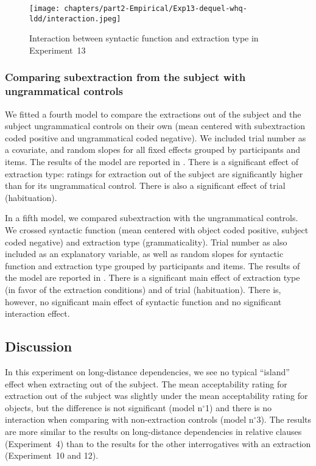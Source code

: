 

\begin{figure}
    \centering
    \texttt{[image: chapters/part2-Empirical/Exp13-dequel-whq-ldd/interaction.jpeg]}
    \caption{Interaction between syntactic function and extraction type in Experiment~13}
    \label{fig:exp13-interaction}
\end{figure}

\subsubsection{Comparing subextraction from the subject with ungrammatical controls}

We fitted a fourth model to compare the extractions out of the subject and the subject ungrammatical controls on their own (mean centered with subextraction coded positive and ungrammatical coded negative). We included trial number as a covariate, and random slopes for all fixed effects grouped by participants and items. The results of the model are reported in . There is a significant effect of extraction type: ratings for extraction out of the subject are significantly higher than for its ungrammatical control. There is also a significant effect of trial (habituation).



In a fifth model, we compared subextraction with the ungrammatical controls. We crossed syntactic function (mean centered with object coded positive, subject coded negative) and extraction type (grammaticality). Trial number as also included as an explanatory variable, as well as random slopes for syntactic function and extraction type grouped by participants and items. The results of the model are reported in . 
There is a significant main effect of extraction type (in favor of the extraction conditions) and of trial (habituation). There is, however, no significant main effect of syntactic function and no significant interaction effect.



\subsection{Discussion}

In this experiment on long-distance dependencies, we see no typical ``island'' effect when extracting out of the subject. The mean acceptability rating for extraction out of the subject was slightly under the mean acceptability rating for objects, but the difference is not significant (model n$^{\circ}$1) and there is no interaction when comparing with non-extraction controls (model n$^{\circ}$3). The results are more similar to the results on long-distance dependencies in relative clauses (Experiment~4) than to the results for the other interrogatives with an extraction (Experiment~10 and 12). 

